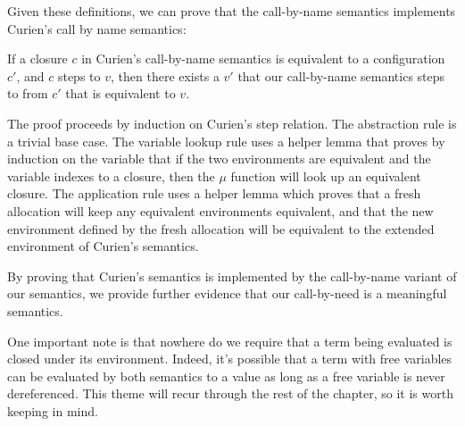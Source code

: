 Given these definitions, we can prove that the call-by-name \ce semantics
implements Curien's call by name semantics: 

\begin{thm}
If a closure $c$ in Curien's call-by-name semantics is equivalent to a
configuration $c'$, and $c$ steps to $v$, then there exists a $v'$ that our
call-by-name semantics steps to from $c'$ that is equivalent to $v$.
\end{thm}
\begin{proofoutline}
The proof proceeds by induction on Curien's step relation. The abstraction rule
is a trivial base case. The variable lookup rule uses a helper lemma that proves
by induction on the variable that if the two environments are equivalent and the
variable indexes to a closure, then the $\mu$ function will look up an
equivalent closure. The application rule uses a helper lemma which proves that a
fresh allocation will keep any equivalent environments equivalent, and that the
new environment defined by the fresh allocation will be equivalent to the
extended environment of Curien's semantics.
\end{proofoutline}

By proving that Curien's semantics is implemented by the call-by-name variant of
our semantics, we provide further evidence that our call-by-need is a meaningful
semantics. 

One important note is that nowhere do we require that a term being evaluated is
closed under its environment. Indeed, it's possible that a term with free variables
can be evaluated by both semantics to a value as long as a free variable is
never dereferenced. This theme will recur through the rest of the chapter, so it
is worth keeping in mind.  
